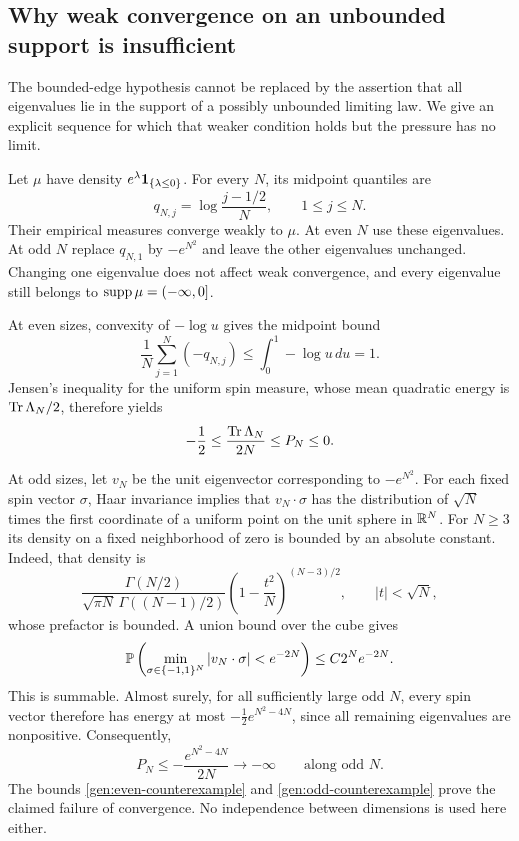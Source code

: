 \subsection{Why weak convergence on an unbounded support is insufficient}

The bounded-edge hypothesis cannot be replaced by the assertion that
all eigenvalues lie in the support of a possibly unbounded limiting
law.  We give an explicit sequence for which that weaker condition
holds but the pressure has no limit.

Let $\mu$ have density $e^\lambda\mathbf 1_{\{\lambda\le0\}}$.
For every $N$, its midpoint quantiles are
\[
 q_{N,j}=\log\frac{j-1/2}{N},\qquad 1\le j\le N.
\]
Their empirical measures converge weakly to $\mu$.  At even $N$ use
these eigenvalues.  At odd $N$ replace $q_{N,1}$ by $-e^{N^2}$ and
leave the other eigenvalues unchanged.  Changing one eigenvalue does
not affect weak convergence, and every eigenvalue still belongs to
$\operatorname{supp}\mu=(-\infty,0]$.

At even sizes, convexity of $-\log u$ gives the midpoint bound
\[
 \frac1N\sum_{j=1}^N(-q_{N,j})
 \le\int_0^1-\log u\,du=1.
\]
Jensen's inequality for the uniform spin measure, whose mean quadratic
energy is $\operatorname{Tr}\Lambda_N/2$, therefore yields
\begin{equation}\label{gen:even-counterexample}
 -\frac12\le\frac{\operatorname{Tr}\Lambda_N}{2N}\le P_N\le0.
\end{equation}

At odd sizes, let $v_N$ be the unit eigenvector corresponding to
$-e^{N^2}$.  For each fixed spin vector $\sigma$, Haar invariance
implies that $v_N\cdot\sigma$ has the distribution of $\sqrt N$
times the first coordinate of a uniform point on the unit sphere in
$\mathbb R^N$.  For $N\ge3$ its density on a fixed neighborhood of zero is
bounded by an absolute constant.  Indeed, that density is
\[
 \frac{\Gamma(N/2)}{\sqrt{\pi N}\,\Gamma((N-1)/2)}
 \left(1-\frac{t^2}{N}\right)^{(N-3)/2},
 \qquad |t|<\sqrt N,
\]
whose prefactor is bounded.  A union bound over the cube gives
\[
 \mathbb P\left(\min_{\sigma\in\{-1,1\}^N}
                  |v_N\cdot\sigma|<e^{-2N}\right)
 \le C2^Ne^{-2N}.
\]
This is summable.  Almost surely, for all sufficiently large odd $N$,
every spin vector therefore has energy at most
$-\tfrac12e^{N^2-4N}$, since all remaining eigenvalues are
nonpositive.  Consequently,
\begin{equation}\label{gen:odd-counterexample}
 P_N\le-\frac{e^{N^2-4N}}{2N}\longrightarrow-\infty
 \qquad\text{along odd }N.
\end{equation}
The bounds \eqref{gen:even-counterexample} and
\eqref{gen:odd-counterexample} prove the claimed failure of
convergence.  No independence between dimensions is used here either.
